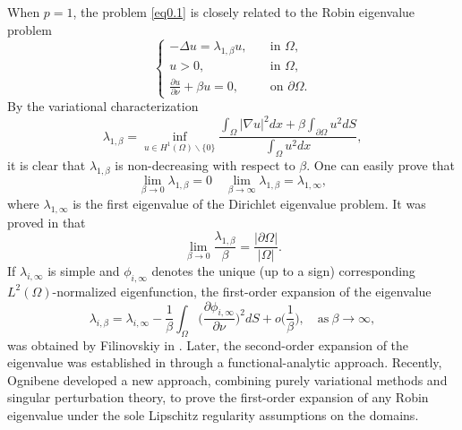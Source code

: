 \documentclass[12pt,reqno]{amsart}
\numberwithin{equation}{section}
\theoremstyle{definition}
\begin{document}
When $p=1$, the problem \eqref{eq0.1} is closely related to the Robin eigenvalue problem 
\begin{equation}\label{1.3}
\begin{cases}
-\Delta u=\lambda_{1,\beta}u,\quad &\text{in }\Omega,\\
u>0,\quad &\text{in }\Omega,\\
\frac{\partial u}{\partial \nu}+\beta u=0,\quad &\text{on }\partial\Omega.
\end{cases}
\end{equation}
By the variational characterization 
$$
\lambda_{1,\beta}=\inf_{u\in H^1(\Omega)\backslash\{0\}}\frac{\int_{\Omega}|\nabla u|^2dx+\beta\int_{\partial\Omega}u^2dS}{\int_{\Omega}u^2dx},
$$
it is clear that $\lambda_{1,\beta}$ is non-decreasing with respect to $\beta$. One can easily prove that 
$$
\lim_{\beta\to0}\lambda_{1,\beta}=0\quad \lim_{\beta\to\infty}\lambda_{1,\beta}=\lambda_{1,\infty},
$$
where $\lambda_{1,\infty}$ is the first eigenvalue of the Dirichlet eigenvalue problem. It was proved in \cite{GS} that 
$$
\lim_{\beta\to0}\frac{\lambda_{1,\beta}}{\beta}=\frac{|\partial\Omega|}{|\Omega|}.
$$
If $\lambda_{i,\infty}$ is simple and $\phi_{i,\infty}$ denotes the unique (up to a sign) corresponding $L^2(\Omega)$-normalized eigenfunction, 
the first-order expansion of the eigenvalue 
$$
\lambda_{i,\beta}=\lambda_{i,\infty}-\frac{1}{\beta}\int_{\Omega}\Big(\frac{\partial \phi_{i,\infty}}{\partial\nu}\Big)^2dS+o\Big(\frac{1}{\beta}\Big),\quad \text{as}\ \beta\to\infty,
$$
was obtained by Filinovskiy in \cite{F}. Later, the second-order expansion of the eigenvalue was established in \cite{BBBT} through a functional-analytic approach. Recently, Ognibene \cite{O} developed a new approach, combining purely variational methods and singular perturbation theory, to prove the first-order expansion of any Robin eigenvalue under the sole Lipschitz regularity assumptions on the domains.
\end{document}
